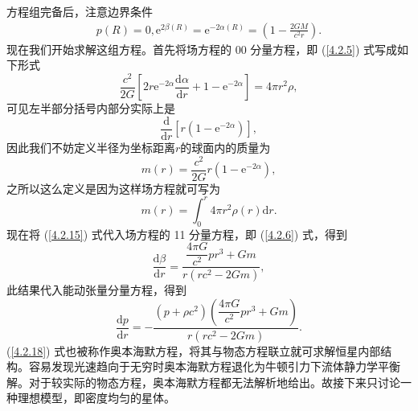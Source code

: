 \documentclass[11pt, a4paper, oneside, onecolumn]{ctexart}
\numberwithin{equation}{subsection}
\begin{document}
方程组完备后，注意边界条件
\begin{align}
p\left(R\right)=0,\mathrm{e}^{2\beta\left(R\right)}=\mathrm{e}^{-2\alpha\left(R\right)}=\left(1-\frac{2GM}{c^{2}r}\right).
\end{align}
现在我们开始求解这组方程。首先将场方程的 00 分量方程，即 (\ref{4.2.5}) 式写成如下形式
\begin{equation}
\frac{c^{2}}{2G}\left[2r\mathrm{e}^{-2\alpha}\frac{\mathrm{d}\alpha}{\mathrm{d}r}+1-\mathrm{e}^{-2\alpha}\right]=4\pi r^{2}\rho,
\end{equation}
可见左半部分括号内部分实际上是
\begin{equation}
\frac{\mathrm{d}}{\mathrm{d}r}\left[r\left(1-\mathrm{e}^{-2\alpha}\right)\right],
\end{equation}
因此我们不妨定义半径为坐标距离$r$的球面内的质量为
\begin{equation}
m\left(r\right)=\frac{c^{2}}{2G}r\left(1-\mathrm{e}^{-2\alpha}\right),\label{4.2.15}
\end{equation}
之所以这么定义是因为这样场方程就可写为
\begin{equation}
m\left(r\right)=\int_{0}^{r}4\pi r^{2}\rho\left(r\right)\mathrm{d}r.
\end{equation}
现在将 (\ref{4.2.15}) 式代入场方程的 11 分量方程，即 (\ref{4.2.6}) 式，得到
\begin{equation}
\frac{\mathrm{d}\beta}{\mathrm{d}r}=\frac{\dfrac{4\pi G}{c^{2}}pr^{3}+Gm}{r\left(rc^{2}-2Gm\right)},\label{4.2.17}
\end{equation}
此结果代入能动张量分量方程，得到
\begin{equation}
\frac{\mathrm{d}p}{\mathrm{d}r}=-\frac{\left(p+\rho c^{2}\right)\left(\dfrac{4\pi G}{c^{2}}pr^{3}+Gm\right)}{r\left(rc^{2}-2Gm\right)}.\label{4.2.18}
\end{equation}
(\ref{4.2.18}) 式也被称作奥本海默方程，将其与物态方程联立就可求解恒星内部结构。容易发现光速趋向于无穷时奥本海默方程退化为牛顿引力下流体静力学平衡解。对于较实际的物态方程，奥本海默方程都无法解析地给出。故接下来只讨论一种理想模型，即密度均匀的星体。
\end{document}
